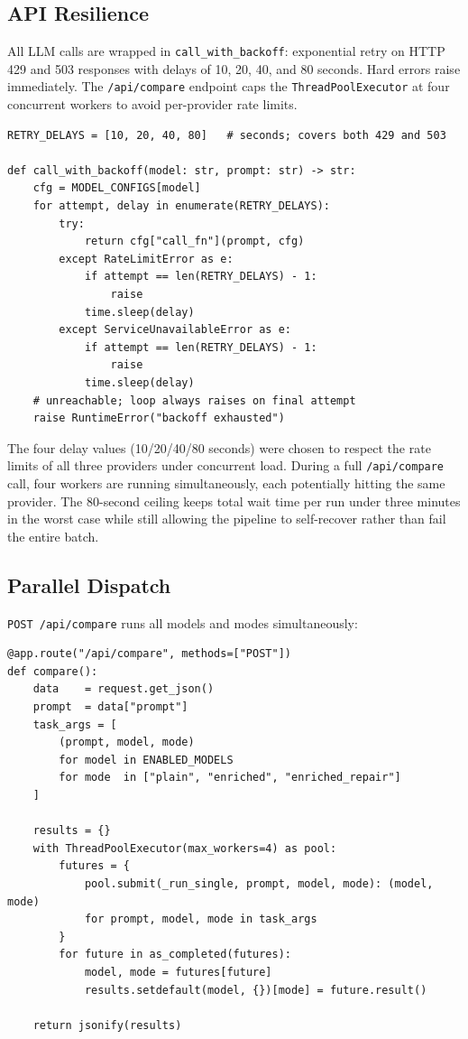 \documentclass[12pt,a4paper]{report}
\begin{document}
\subsection{API Resilience}

All LLM calls are wrapped in \texttt{call\_with\_backoff}: exponential retry on
HTTP 429 and 503 responses with delays of 10, 20, 40, and 80 seconds. Hard errors
raise immediately. The \texttt{/api/compare} endpoint caps the
\texttt{ThreadPoolExecutor} at four concurrent workers to avoid per-provider rate
limits.

\begin{lstlisting}[caption={\texttt{call\_with\_backoff} in \texttt{llm\_client.py}},
                   label={lst:backoff}]
RETRY_DELAYS = [10, 20, 40, 80]   # seconds; covers both 429 and 503

def call_with_backoff(model: str, prompt: str) -> str:
    cfg = MODEL_CONFIGS[model]
    for attempt, delay in enumerate(RETRY_DELAYS):
        try:
            return cfg["call_fn"](prompt, cfg)
        except RateLimitError as e:
            if attempt == len(RETRY_DELAYS) - 1:
                raise
            time.sleep(delay)
        except ServiceUnavailableError as e:
            if attempt == len(RETRY_DELAYS) - 1:
                raise
            time.sleep(delay)
    # unreachable; loop always raises on final attempt
    raise RuntimeError("backoff exhausted")
\end{lstlisting}

The four delay values (10/20/40/80 seconds) were chosen to respect the rate
limits of all three providers under concurrent load. During a full
\texttt{/api/compare} call, four workers are running simultaneously, each
potentially hitting the same provider. The 80-second ceiling keeps total wait
time per run under three minutes in the worst case while still allowing the
pipeline to self-recover rather than fail the entire batch.

\subsection{Parallel Dispatch}

\texttt{POST /api/compare} runs all models and modes simultaneously:

\begin{lstlisting}[caption={Parallel dispatch in \texttt{app.py}},
                   label={lst:parallel}]
@app.route("/api/compare", methods=["POST"])
def compare():
    data    = request.get_json()
    prompt  = data["prompt"]
    task_args = [
        (prompt, model, mode)
        for model in ENABLED_MODELS
        for mode  in ["plain", "enriched", "enriched_repair"]
    ]

    results = {}
    with ThreadPoolExecutor(max_workers=4) as pool:
        futures = {
            pool.submit(_run_single, prompt, model, mode): (model, mode)
            for prompt, model, mode in task_args
        }
        for future in as_completed(futures):
            model, mode = futures[future]
            results.setdefault(model, {})[mode] = future.result()

    return jsonify(results)
\end{lstlisting}
\end{document}
